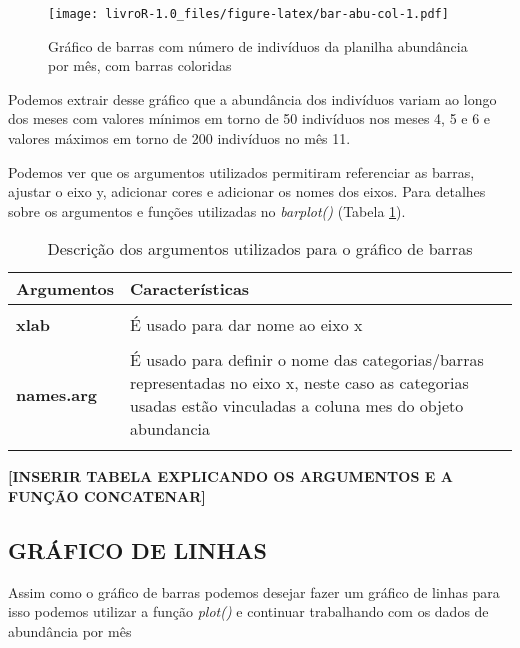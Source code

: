 \documentclass[]{book}
\begin{document}
\begin{figure}
\centering
\texttt{[image: livroR-1.0\_files/figure-latex/bar-abu-col-1.pdf]}
\caption{\label{fig:bar-abu-col}Gráfico de barras com número de indivíduos da planilha abundância por mês, com barras coloridas}
\end{figure}

Podemos extrair desse gráfico que a abundância dos indivíduos variam ao longo dos meses com valores mínimos em torno de 50 indivíduos nos meses 4, 5 e 6 e valores máximos em torno de 200 indivíduos no mês 11.

Podemos ver que os argumentos utilizados permitiram referenciar as barras, ajustar o eixo y, adicionar cores e adicionar os nomes dos eixos. Para detalhes sobre os argumentos e funções utilizadas no \emph{barplot()} (Tabela \ref{tab:tab-arg}).

\begin{table}

\caption{\label{tab:tab-arg}Descrição dos argumentos utilizados para o gráfico de barras}
\centering
\begin{tabular}[t]{>{}l>{\raggedright\arraybackslash}p{30em}}
\toprule
Argumentos & Características\\
\midrule
\textbf{\cellcolor{gray!6}{ylim}} & \cellcolor{gray!6}{Refere-se aos limites do eixo y}\\
\textbf{xlab} & É usado para dar nome ao eixo x\\
\textbf{\cellcolor{gray!6}{ylab}} & \cellcolor{gray!6}{É usado para dar nome ao eixo y}\\
\textbf{names.arg} & É usado para definir o nome das categorias/barras representadas no eixo x, neste caso as categorias usadas estão vinculadas a coluna mes do objeto abundancia\\
\textbf{\cellcolor{gray!6}{col}} & \cellcolor{gray!6}{É usado para definir a cor das barras}\\
\bottomrule
\end{tabular}
\end{table}

\textbf{{[}INSERIR TABELA EXPLICANDO OS ARGUMENTOS E A FUNÇÃO CONCATENAR{]}}

\hypertarget{gruxe1fico-de-linhas}{%
\subsection{GRÁFICO DE LINHAS}\label{gruxe1fico-de-linhas}}

Assim como o gráfico de barras podemos desejar fazer um gráfico de linhas para isso podemos utilizar a função \emph{plot()} e continuar trabalhando com os dados de abundância por mês
\end{document}
